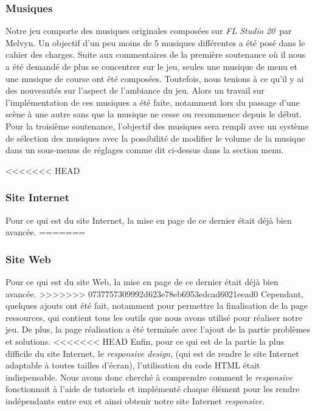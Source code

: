 \documentclass[a4paper,12pt]{article}
\newcommand{\FL}{\textsl{FL Studio 20}}
\begin{document}
            \subsubsection{Musiques}
                Notre jeu comporte des musiques originales composées sur \FL\, par Melvyn. Un objectif d'un 
                peu moins de 5 musiques différentes a été posé dans le cahier des charges. Suite aux 
                commentaires de la première soutenance où il nous a été demandé de plus se concentrer sur le
                jeu, seules une musique de menu et une musique de course ont été composées. Toutefois, nous 
                tenions à ce qu'il y ai des nouveautés sur l'aspect de l'ambiance du jeu. Alors un travail 
                sur l'implémentation de ces musiques a été faite, notamment lors du passage d'une scène à
                une autre sans que la musique ne cesse ou recommence depuis le début. Pour la troisième 
                soutenance, l'objectif des musiques sera rempli avec un système de sélection des musiques 
                avec la possibilité de modifier le volume de la musique dans un sous-menus de réglages comme
                dit ci-dessus dans la section menu.
            
<<<<<<< HEAD
            \subsubsection{Site Internet}
                Pour ce qui est du site Internet, la mise en page de ce dernier était déjà bien avancée. 
=======
            \subsubsection{Site Web}
                Pour ce qui est du site Web, la mise en page de ce dernier était déjà bien avancée. 
>>>>>>> 0737757309992d623e78eb6953edcad6021eead0
                Cependant, quelques ajouts ont été fait, notamment pour permettre la finalisation de la 
                page ressources, qui contient tous les outils que nous avons utilisé pour réaliser notre 
                jeu. De plus, la page réalisation a été terminée avec l'ajout de la partie 
                problèmes et solutions.
<<<<<<< HEAD
                Enfin, pour ce qui est de la partie la plus difficile du site Internet, le \textit{responsive 
                design}, (qui est de rendre le site Internet adaptable à toutes tailles d'écran), l'utilisation 
                du code HTML était indispensable. Nous avons donc cherché à comprendre comment le 
                \textit{responsive} fonctionnait à l'aide de tutoriels et implémenté chaque élément 
                pour les rendre indépendants entre eux et ainsi obtenir notre site Internet \textit{responsive}.
                
\end{document}
